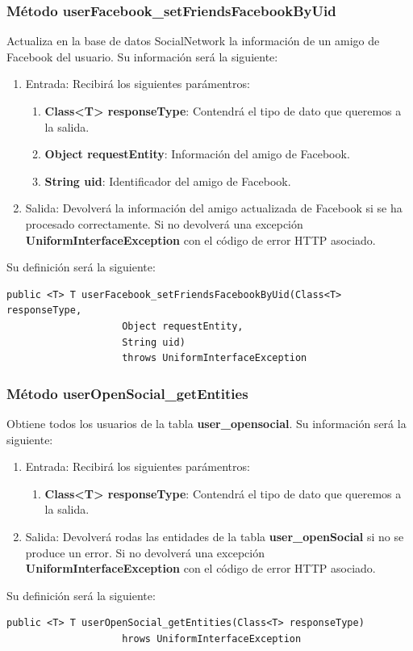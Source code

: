 \subsubsection{Método userFacebook\_setFriendsFacebookByUid}
Actualiza en la base de datos SocialNetwork la información de un amigo de Facebook del usuario. Su información será la siguiente:
\begin{enumerate}
\item Entrada: Recibirá los siguientes parámentros:
\begin{enumerate}
\item \textbf{Class<T> responseType}: Contendrá el tipo de dato que queremos a la salida.
\item \textbf{Object requestEntity}: Información del amigo de Facebook.
\item \textbf{String uid}: Identificador del amigo de Facebook.
\end{enumerate}
\item Salida: Devolverá la información del amigo actualizada de Facebook si se ha procesado correctamente. Si no devolverá una excepción \textbf{UniformInterfaceException} con el código de error HTTP asociado.
\end{enumerate}
\bigskip
\par
Su definición será la siguiente:
\begin{verbatim}public <T> T userFacebook_setFriendsFacebookByUid(Class<T> responseType, 
					Object requestEntity, 
					String uid) 
					throws UniformInterfaceException \end{verbatim}



\subsubsection{Método userOpenSocial\_getEntities}
Obtiene todos los usuarios de la tabla \textbf{user\_opensocial}. Su información será la siguiente:
\begin{enumerate}
\item Entrada: Recibirá los siguientes parámentros:
\begin{enumerate}
\item \textbf{Class<T> responseType}: Contendrá el tipo de dato que queremos a la salida.
\end{enumerate}
\item Salida: Devolverá rodas las entidades de la tabla \textbf{user\_openSocial} si no se produce un error. Si no devolverá una excepción \textbf{UniformInterfaceException} con el código de error HTTP asociado.
\end{enumerate}
\bigskip
\par
Su definición será la siguiente:
\begin{verbatim}public <T> T userOpenSocial_getEntities(Class<T> responseType) 
					hrows UniformInterfaceException \end{verbatim}


